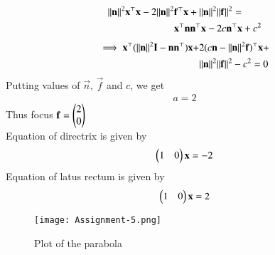 \documentclass[journal,12pt,twocolumn]{IEEEtran}
\begin{document}
\begin{align}
    \lVert\mathbf{n}\rVert^2\mathbf{x}^\top\mathbf{x}-2\lVert\mathbf{n}\rVert^2&\mathbf{f}^\top\mathbf{x}+\lVert\mathbf{n}\rVert^2\lVert\mathbf{f}\rVert^2 = \nonumber \\
    &\mathbf{x}^\top\mathbf{n}\mathbf{n}^\top\mathbf{x} -2c\mathbf{n}^\top\mathbf{x}+c^2
\end{align}
\begin{align}
    \implies \mathbf{x}^\top(\lVert\mathbf{n}\rVert^2\mathbf{I}-\mathbf{n}\mathbf{n^\top})\mathbf{x}+&2(c\mathbf{n}-\lVert\mathbf{n}\rVert^2\mathbf{f})^\top\mathbf{x}+ \nonumber \\
    &\lVert\mathbf{n}\rVert^2\lVert\mathbf{f}\rVert^2-c^2=0
\end{align}
Putting values of $\vec{n}$, $\vec{f}$ and $c$, we get
\begin{align}
   a=2
\end{align}
Thus focus $\mathbf{f}=\begin{pmatrix}2\\0\end{pmatrix}$\\
Equation of directrix is given by
\begin{align}
    \begin{pmatrix}1&0\end{pmatrix}\mathbf{x}=-2
\end{align}
Equation of latus rectum is given by
\begin{align}
    \begin{pmatrix}1&0\end{pmatrix}\mathbf{x}=2
\end{align}
\begin{figure}[!ht]
    \centering
    \texttt{[image: Assignment-5.png]}
    \caption{Plot of the parabola}
    \label{plot}
\end{figure}
\end{document}
